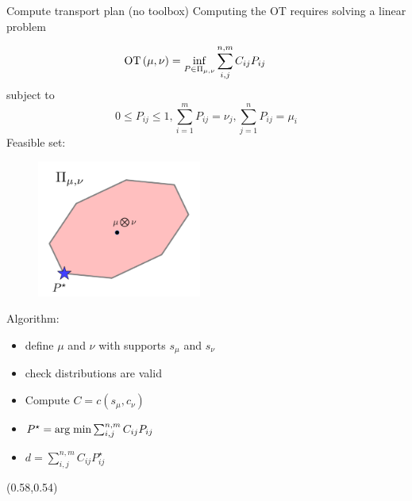 \documentclass[pdf,aspectratio=169,10pt]{beamer}
\begin{document}
 

\begin{frame}{ Compute transport plan (no toolbox)}
    Computing the OT requires solving a linear problem

\begin{minipage}{0.49\textwidth}  
\begin{equation*}
    \hspace{-2em}\OT{(\mu,\nu)} = \inf_{P\in\Pi_{\mu,\nu}}  \sum_{i,j}^{n,m} C_{ij}P_{ij} 
\end{equation*}
subject to
\begin{equation*}
    0\leq P_{ij} \leq 1, \sum_{i=1}^m P_{ij} = \nu_j,  \sum_{j=1}^n P_{ij} = \mu_i
\end{equation*}
Feasible set:
\begin{figure}
            \includegraphics[width=0.48\textwidth]{../img/polytope1.pdf}\hspace{2em}

\end{figure}

\end{minipage}
\hfill
\begin{minipage}{0.49\textwidth}  
Algorithm:

\begin{itemize}
    \item define $\mu$ and $\nu$ with supports $s_\mu$ and $s_\nu$
    \item check distributions are valid
    \item Compute $C = c(s_\mu,c_\nu)$
    \item $P^\star = \mathop{\rm arg \; min}\limits \sum_{i,j}^{n,m} C_{ij}P_{ij} $
    \item $d = \sum_{i,j}^{n,m} C_{ij}P^\star_{ij}$ 
\end{itemize}
\end{minipage}

\begin{textblock}{0.45} (0.58,0.54)
\small
{}
\end{textblock}
\end{frame}
\end{document}
